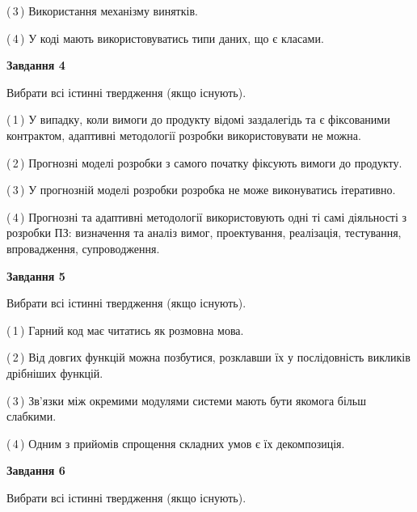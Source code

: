\documentclass[10pt, ukrainian]{article}
\begin{document}
{\begin {large}
(\,3\,) Використання механізму винятків. %



(\,4\,) У коді мають використовуватись типи даних, що є класами. %


{\begin {center}\textbf{Завдання 4}\end {center}}\par
Вибрати всі істинні твердження (якщо існують).\par
\vspace{2mm}



(\,1\,) У випадку, коли вимоги до продукту відомі заздалегідь та є фіксованими контрактом, адаптивні методології розробки використовувати не можна. %



(\,2\,) Прогнозні моделі розробки з самого початку фіксують вимоги до продукту. %



(\,3\,) У прогнозній моделі розробки розробка не може виконуватись ітеративно. %



(\,4\,) Прогнозні та адаптивні методології використовують одні ті самі діяльності з розробки ПЗ: визначення та аналіз вимог, проектування, реалізація, тестування, впровадження, супроводження. %


{\begin {center}\textbf{Завдання 5}\end {center}}\par
Вибрати всі істинні твердження (якщо існують).\par
\vspace{2mm}



(\,1\,) Гарний код має читатись як розмовна мова. %



(\,2\,) Від довгих функцій можна позбутися, розклавши їх у послідовність викликів дрібніших функцій. %



(\,3\,) Зв'язки між окремими модулями системи мають бути якомога більш слабкими. %



(\,4\,) Одним з прийомів спрощення складних умов є їх декомпозиція. %

\newpage

{\begin {center}\textbf{Завдання 6}\end {center}}\par
Вибрати всі істинні твердження (якщо існують).\par
\vspace{2mm}




\end{large}}
\end{document}
